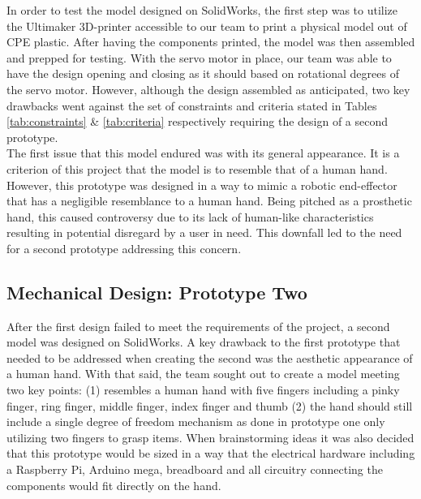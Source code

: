 \documentclass[11.5pt]{article}
\begin{document}
In order to test the model designed on SolidWorks, the first step was to utilize the Ultimaker 3D-printer accessible to our team to print a physical model out of CPE plastic. After having the components printed, the model was then assembled and prepped for testing. With the servo motor in place, our team was able to have the design opening and closing as it should based on rotational degrees of the servo motor. However, although the design assembled as anticipated, two key drawbacks went against the set of constraints and criteria stated in Tables \ref{tab:constraints} \& \ref{tab:criteria} respectively requiring the design of a second prototype. \\

The first issue that this model endured was with its general appearance. It is a criterion of this project that the model is to resemble that of a human hand. However, this prototype was designed in a way to mimic a robotic end-effector that has a negligible resemblance to a human hand. Being pitched as a prosthetic hand, this caused controversy due to its lack of human-like characteristics resulting in potential disregard by a user in need. This downfall led to the need for a second prototype addressing this concern. 

\newpage
\subsection{Mechanical Design: Prototype Two}

After the first design failed to meet the requirements of the project, a second model was designed on SolidWorks. A key drawback to the first prototype that needed to be addressed when creating the second was the aesthetic appearance of a human hand. With that said, the team sought out to create a model meeting two key points: (1) resembles a human hand with five fingers including a pinky finger, ring finger, middle finger, index finger and thumb (2) the hand should still include a single degree of freedom mechanism as done in prototype one only utilizing two fingers to grasp items. When brainstorming ideas it was also decided that this prototype would be sized in a way that the electrical hardware including a Raspberry Pi, Arduino mega, breadboard and all circuitry connecting the components would fit directly on the hand.\\
\end{document}
